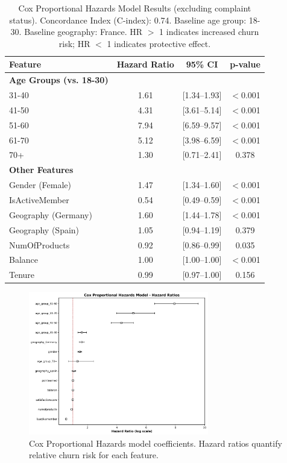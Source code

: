 \documentclass[12pt]{article}
\begin{document}
\begin{table}[H]
\centering
\small
\caption{Cox Proportional Hazards Model Results (excluding complaint status). Concordance Index (C-index): 0.74. Baseline age group: 18-30. Baseline geography: France. HR $>$ 1 indicates increased churn risk; HR $<$ 1 indicates protective effect.}
\label{tab:cox_results}
\begin{tabular}{lccc}
\toprule
\textbf{Feature} & \textbf{Hazard Ratio} & \textbf{95\% CI} & \textbf{p-value} \\
\midrule
\textbf{Age Groups (vs. 18-30)} & & & \\
\phantom{---} 31-40 & 1.61 & [1.34–1.93] & $<$0.001 \\
\phantom{---} 41-50 & 4.31 & [3.61–5.14] & $<$0.001 \\
\phantom{---} 51-60 & 7.94 & [6.59–9.57] & $<$0.001 \\
\phantom{---} 61-70 & 5.12 & [3.98–6.59] & $<$0.001 \\
\phantom{---} 70+ & 1.30 & [0.71–2.41] & 0.378 \\
\midrule
\textbf{Other Features} & & & \\
\phantom{---} Gender (Female) & 1.47 & [1.34–1.60] & $<$0.001 \\
\phantom{---} IsActiveMember & 0.54 & [0.49–0.59] & $<$0.001 \\
\phantom{---} Geography (Germany) & 1.60 & [1.44–1.78] & $<$0.001 \\
\phantom{---} Geography (Spain) & 1.05 & [0.94–1.19] & 0.379 \\
\phantom{---} NumOfProducts & 0.92 & [0.86–0.99] & 0.035 \\
\phantom{---} Balance & 1.00 & [1.00–1.00] & $<$0.001 \\
\phantom{---} Tenure & 0.99 & [0.97–1.00] & 0.156 \\
\bottomrule
\end{tabular}
\end{table}

\begin{figure}[H]
\centering
\includegraphics[width=0.7\textwidth]{img/14_cox_ph_coefficients.png}
\caption{Cox Proportional Hazards model coefficients. Hazard ratios quantify relative churn risk for each feature.}
\label{fig:cox_coefficients}
\end{figure}
\end{document}
